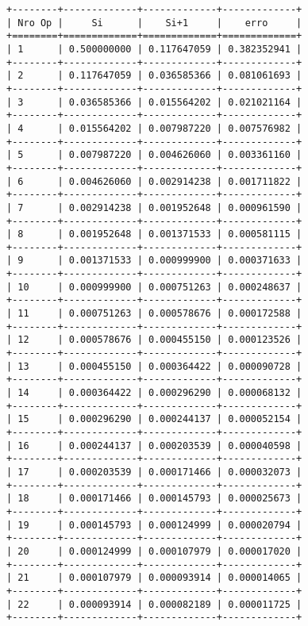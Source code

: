 \documentclass[11pt]{article}
\begin{document}
    \begin{Verbatim}[commandchars=\\\{\}]
+--------+-------------+-------------+-------------+
| Nro Op |     Si      |    Si+1     |    erro     |
+========+=============+=============+=============+
| 1      | 0.500000000 | 0.117647059 | 0.382352941 |
+--------+-------------+-------------+-------------+
| 2      | 0.117647059 | 0.036585366 | 0.081061693 |
+--------+-------------+-------------+-------------+
| 3      | 0.036585366 | 0.015564202 | 0.021021164 |
+--------+-------------+-------------+-------------+
| 4      | 0.015564202 | 0.007987220 | 0.007576982 |
+--------+-------------+-------------+-------------+
| 5      | 0.007987220 | 0.004626060 | 0.003361160 |
+--------+-------------+-------------+-------------+
| 6      | 0.004626060 | 0.002914238 | 0.001711822 |
+--------+-------------+-------------+-------------+
| 7      | 0.002914238 | 0.001952648 | 0.000961590 |
+--------+-------------+-------------+-------------+
| 8      | 0.001952648 | 0.001371533 | 0.000581115 |
+--------+-------------+-------------+-------------+
| 9      | 0.001371533 | 0.000999900 | 0.000371633 |
+--------+-------------+-------------+-------------+
| 10     | 0.000999900 | 0.000751263 | 0.000248637 |
+--------+-------------+-------------+-------------+
| 11     | 0.000751263 | 0.000578676 | 0.000172588 |
+--------+-------------+-------------+-------------+
| 12     | 0.000578676 | 0.000455150 | 0.000123526 |
+--------+-------------+-------------+-------------+
| 13     | 0.000455150 | 0.000364422 | 0.000090728 |
+--------+-------------+-------------+-------------+
| 14     | 0.000364422 | 0.000296290 | 0.000068132 |
+--------+-------------+-------------+-------------+
| 15     | 0.000296290 | 0.000244137 | 0.000052154 |
+--------+-------------+-------------+-------------+
| 16     | 0.000244137 | 0.000203539 | 0.000040598 |
+--------+-------------+-------------+-------------+
| 17     | 0.000203539 | 0.000171466 | 0.000032073 |
+--------+-------------+-------------+-------------+
| 18     | 0.000171466 | 0.000145793 | 0.000025673 |
+--------+-------------+-------------+-------------+
| 19     | 0.000145793 | 0.000124999 | 0.000020794 |
+--------+-------------+-------------+-------------+
| 20     | 0.000124999 | 0.000107979 | 0.000017020 |
+--------+-------------+-------------+-------------+
| 21     | 0.000107979 | 0.000093914 | 0.000014065 |
+--------+-------------+-------------+-------------+
| 22     | 0.000093914 | 0.000082189 | 0.000011725 |
+--------+-------------+-------------+-------------+

\end{Verbatim}
\end{document}
